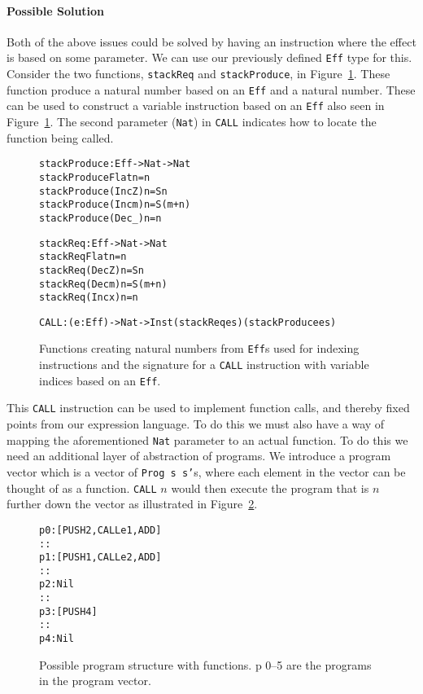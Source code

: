 \paragraph{Possible Solution}
Both of the above issues could be solved by having an instruction where the effect is based on some parameter. We can use our previously defined \texttt{Eff} type for this. Consider the two functions, \texttt{stackReq} and \texttt{stackProduce}, in Figure~\ref{fig:stack_effect_functions}. These function produce a natural number based on an \texttt{Eff} and a natural number. These can be used to construct a variable instruction based on an \texttt{Eff} also seen in Figure~\ref{fig:stack_effect_functions}. The second parameter (\texttt{Nat}) in \texttt{CALL} indicates how to locate the function being called.

\begin{figure}
\begin{alltt}
stackProduce : Eff -> Nat -> Nat
stackProduce Flat n = n
stackProduce (Inc Z) n = S n
stackProduce (Inc m) n = S (m+n)
stackProduce (Dec _) n = n

stackReq : Eff -> Nat -> Nat
stackReq Flat n = n
stackReq (Dec Z) n = S n
stackReq (Dec m) n = S (m+n)
stackReq (Inc x) n = n

CALL : (e : Eff) -> Nat -> Inst (stackReq e s) (stackProduce e s)
\end{alltt}
\caption{Functions creating natural numbers from \texttt{Eff}s used for indexing instructions and the signature for a \texttt{CALL} instruction with variable indices based on an \texttt{Eff}.}
\label{fig:stack_effect_functions}
\end{figure}

This \texttt{CALL} instruction can be used to implement function calls, and thereby fixed points from our expression language. To do this we must also have a way of mapping the aforementioned \texttt{Nat} parameter to an actual function. To do this we need an additional layer of abstraction of programs. We introduce a program vector which is a vector of \texttt{Prog s s'}s, where each element in the vector can be thought of as a function. \texttt{CALL} $n$ would then execute the program that is $n$ further down the vector as illustrated in Figure~\ref{fig:program_structure}.

\begin{figure}
\begin{alltt}
p 0: [PUSH 2, CALL e 1, ADD]
     ::
p 1: [PUSH 1, CALL e 2, ADD]
     ::
p 2: Nil
     ::
p 3: [PUSH 4]
     ::
p 4: Nil
\end{alltt}
\caption{Possible program structure with functions. p 0--5 are the programs in the program vector.}
\label{fig:program_structure}
\end{figure}

